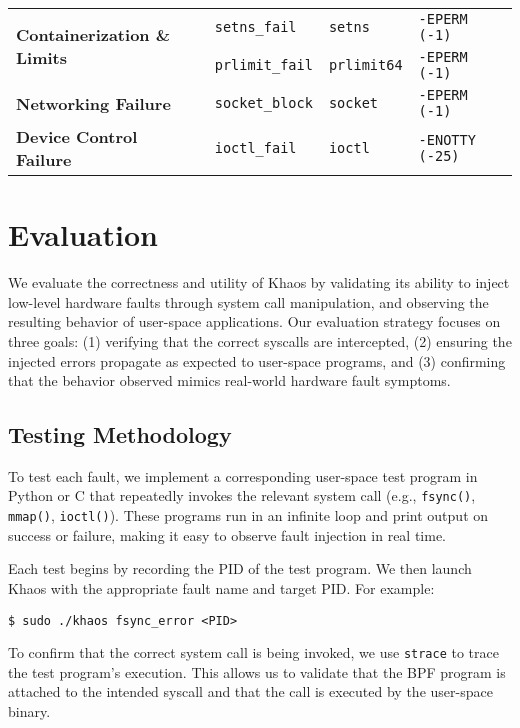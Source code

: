\begin{table}[ht]
{\begin{tabular}{l|l|l|l}
\midrule
\multirow{2}{*}{\textbf{Containerization \& Limits}} 
    & \texttt{setns\_fail}         & \texttt{setns}        & \texttt{-EPERM (-1)} \\
    & \texttt{prlimit\_fail}       & \texttt{prlimit64}    & \texttt{-EPERM (-1)} \\
\midrule
\textbf{Networking Failure} 
    & \texttt{socket\_block}       & \texttt{socket}       & \texttt{-EPERM (-1)} \\
\midrule
\textbf{Device Control Failure} 
    & \texttt{ioctl\_fail}         & \texttt{ioctl}        & \texttt{-ENOTTY (-25)} \\
\bottomrule
\end{tabular}
}
\end{table}

\section{Evaluation}

We evaluate the correctness and utility of Khaos by validating its ability to inject low-level hardware faults through system call manipulation, and observing the resulting behavior of user-space applications. Our evaluation strategy focuses on three goals: (1) verifying that the correct syscalls are intercepted, (2) ensuring the injected errors propagate as expected to user-space programs, and (3) confirming that the behavior observed mimics real-world hardware fault symptoms.

\subsection{Testing Methodology}

To test each fault, we implement a corresponding user-space test program in Python or C that repeatedly invokes the relevant system call (e.g., \texttt{fsync()}, \texttt{mmap()}, \texttt{ioctl()}). These programs run in an infinite loop and print output on success or failure, making it easy to observe fault injection in real time.

Each test begins by recording the PID of the test program. We then launch Khaos with the appropriate fault name and target PID. For example:
\begin{verbatim}
$ sudo ./khaos fsync_error <PID>
\end{verbatim}

To confirm that the correct system call is being invoked, we use \texttt{strace} to trace the test program’s execution. This allows us to validate that the BPF program is attached to the intended syscall and that the call is executed by the user-space binary.

